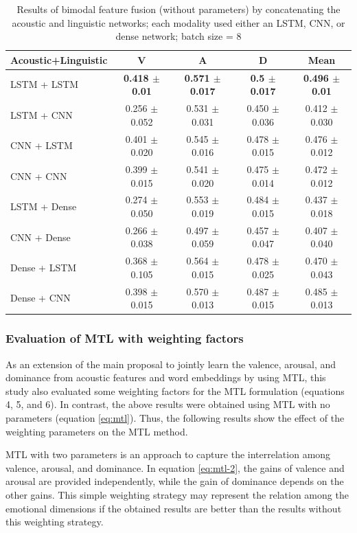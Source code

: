 \begin{table}[htpb]
 \begin{center}
\caption{Results of bimodal feature fusion (without parameters) by
concatenating the acoustic and linguistic networks; each modality used either an
LSTM, CNN, or dense network; batch size = 8}
 \label{tab:bimodal-result}
 \begin{tabular}{l c c c c} 
 \hline
Acoustic+Linguistic & V & A & D & Mean\\
\hline \hline
LSTM + LSTM & \textbf{0.418 $\pm$ 0.01} & \textbf{0.571 $\pm$ 0.017} &
\textbf{0.5 $ \pm$ 0.017} & \textbf{0.496 $\pm$ 0.01} \\
LSTM + CNN & 0.256 $\pm$ 0.052 & 0.531 $\pm$ 0.031 & 0.450 $ \pm$ 0.036 & 0.412
$\pm$ 0.030 \\
CNN + LSTM & 0.401 $\pm$ 0.020 & 0.545 $\pm$ 0.016 & 0.478 $ \pm$ 0.015 & 0.476
$\pm$ 0.012 \\
CNN + CNN & 0.399 $\pm$ 0.015 & 0.541 $\pm$ 0.020 & 0.475 $ \pm$ 0.014 & 0.472
$\pm$ 0.012 \\
LSTM + Dense & 0.274 $\pm$ 0.050 & 0.553 $\pm$ 0.019 & 0.484 $ \pm$ 0.015 &
0.437 $\pm$ 0.018 \\
CNN + Dense & 0.266 $\pm$ 0.038 & 0.497 $\pm$ 0.059 & 0.457 $ \pm$ 0.047 &
0.407 $\pm$ 0.040 \\
Dense + LSTM & 0.368 $\pm$ 0.105 & 0.564 $\pm$ 0.015 & 0.478 $ \pm$ 0.025 &
0.470 $\pm$ 0.043 \\
Dense + CNN & 0.398 $\pm$ 0.015 & 0.570 $\pm$ 0.013 & 0.487 $ \pm$ 0.015 &
0.485 $\pm$ 0.013 \\
 \hline
 \end{tabular}
 \end{center}
\end{table}

\subsubsection{Evaluation of MTL with weighting factors}
As an extension of the main proposal to jointly learn the valence, arousal, and
dominance from acoustic features and word embeddings by using MTL, this study
also evaluated some weighting factors for the MTL formulation (equations 4, 5,
and 6). In contrast, the above results were obtained using MTL with no
parameters (equation \ref{eq:mtl}). Thus, the following results show the effect
of the weighting parameters on the MTL method.

MTL with two parameters is an approach to capture the interrelation among
valence, arousal, and dominance. In equation \ref{eq:mtl-2}, the gains of
valence and arousal are provided independently, while the gain of dominance
depends on the other gains. This simple weighting strategy may represent the
relation among the emotional dimensions if the obtained results are better than
the results without this weighting strategy.

